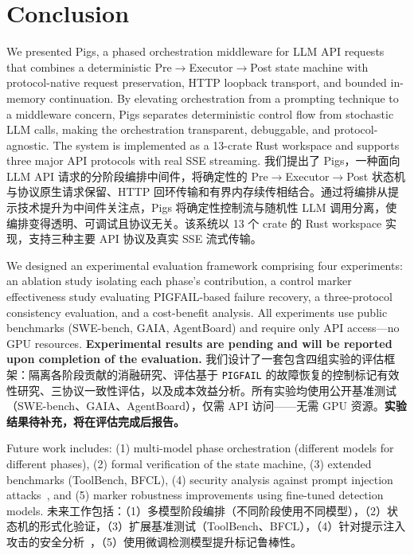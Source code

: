 \section{Conclusion}
\label{sec:conclusion}

We presented Pigs, a phased orchestration middleware for LLM API requests that combines a deterministic Pre$\rightarrow$Executor$\rightarrow$Post state machine with protocol-native request preservation, HTTP loopback transport, and bounded in-memory continuation. By elevating orchestration from a prompting technique to a middleware concern, Pigs separates deterministic control flow from stochastic LLM calls, making the orchestration transparent, debuggable, and protocol-agnostic. The system is implemented as a 13-crate Rust workspace and supports three major API protocols with real SSE streaming.
我们提出了 Pigs，一种面向 LLM API 请求的分阶段编排中间件，将确定性的 Pre$\rightarrow$Executor$\rightarrow$Post 状态机与协议原生请求保留、HTTP 回环传输和有界内存续传相结合。通过将编排从提示技术提升为中间件关注点，Pigs 将确定性控制流与随机性 LLM 调用分离，使编排变得透明、可调试且协议无关。该系统以 13 个 crate 的 Rust workspace 实现，支持三种主要 API 协议及真实 SSE 流式传输。

We designed an experimental evaluation framework comprising four experiments: an ablation study isolating each phase's contribution, a control marker effectiveness study evaluating PIGFAIL-based failure recovery, a three-protocol consistency evaluation, and a cost-benefit analysis. All experiments use public benchmarks (SWE-bench, GAIA, AgentBoard) and require only API access---no GPU resources. \textbf{Experimental results are pending and will be reported upon completion of the evaluation.}
我们设计了一套包含四组实验的评估框架：隔离各阶段贡献的消融研究、评估基于 \texttt{PIGFAIL} 的故障恢复的控制标记有效性研究、三协议一致性评估，以及成本效益分析。所有实验均使用公开基准测试（SWE-bench、GAIA、AgentBoard），仅需 API 访问——无需 GPU 资源。\textbf{实验结果待补充，将在评估完成后报告。}

Future work includes: (1) multi-model phase orchestration (different models for different phases), (2) formal verification of the state machine, (3) extended benchmarks (ToolBench, BFCL), (4) security analysis against prompt injection attacks~\citep{greshake2023promptinjection}, and (5) marker robustness improvements using fine-tuned detection models.
未来工作包括：（1）多模型阶段编排（不同阶段使用不同模型），（2）状态机的形式化验证，（3）扩展基准测试（ToolBench、BFCL），（4）针对提示注入攻击的安全分析~\citep{greshake2023promptinjection}，（5）使用微调检测模型提升标记鲁棒性。
